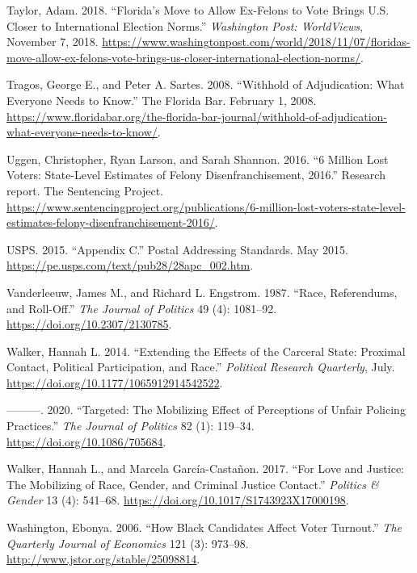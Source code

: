 \documentclass[
  12pt,
]{article}
\newlength{\cslhangindent}
\newenvironment{cslreferences}%
  {\setlength{\parindent}{0pt}%
  \everypar{\setlength{\hangindent}{\cslhangindent}}\ignorespaces}%
  {\par}
\begin{document}
\begin{cslreferences}
\leavevmode\hypertarget{ref-Taylor2018}{}%
Taylor, Adam. 2018. ``Florida's Move to Allow Ex-Felons to Vote Brings U.S. Closer to International Election Norms.'' \emph{Washington Post: WorldViews}, November 7, 2018. \url{https://www.washingtonpost.com/world/2018/11/07/floridas-move-allow-ex-felons-vote-brings-us-closer-international-election-norms/}.

\leavevmode\hypertarget{ref-Tragos2008}{}%
Tragos, George E., and Peter A. Sartes. 2008. ``Withhold of Adjudication: What Everyone Needs to Know.'' The Florida Bar. February 1, 2008. \url{https://www.floridabar.org/the-florida-bar-journal/withhold-of-adjudication-what-everyone-needs-to-know/}.

\leavevmode\hypertarget{ref-sentencing_2016}{}%
Uggen, Christopher, Ryan Larson, and Sarah Shannon. 2016. ``6 Million Lost Voters: State-Level Estimates of Felony Disenfranchisement, 2016.'' Research report. The Sentencing Project. \url{https://www.sentencingproject.org/publications/6-million-lost-voters-state-level-estimates-felony-disenfranchisement-2016/}.

\leavevmode\hypertarget{ref-USPS2015}{}%
USPS. 2015. ``Appendix C.'' Postal Addressing Standards. May 2015. \url{https://pe.usps.com/text/pub28/28apc_002.htm}.

\leavevmode\hypertarget{ref-Vanderleeuw1987}{}%
Vanderleeuw, James M., and Richard L. Engstrom. 1987. ``Race, Referendums, and Roll-Off.'' \emph{The Journal of Politics} 49 (4): 1081--92. \url{https://doi.org/10.2307/2130785}.

\leavevmode\hypertarget{ref-Walker2014}{}%
Walker, Hannah L. 2014. ``Extending the Effects of the Carceral State: Proximal Contact, Political Participation, and Race.'' \emph{Political Research Quarterly}, July. \url{https://doi.org/10.1177/1065912914542522}.

\leavevmode\hypertarget{ref-Walker2020}{}%
---------. 2020. ``Targeted: The Mobilizing Effect of Perceptions of Unfair Policing Practices.'' \emph{The Journal of Politics} 82 (1): 119--34. \url{https://doi.org/10.1086/705684}.

\leavevmode\hypertarget{ref-Walker2017}{}%
Walker, Hannah L., and Marcela García-Castañon. 2017. ``For Love and Justice: The Mobilizing of Race, Gender, and Criminal Justice Contact.'' \emph{Politics \& Gender} 13 (4): 541--68. \url{https://doi.org/10.1017/S1743923X17000198}.

\leavevmode\hypertarget{ref-Washington2006}{}%
Washington, Ebonya. 2006. ``How Black Candidates Affect Voter Turnout.'' \emph{The Quarterly Journal of Economics} 121 (3): 973--98. \url{http://www.jstor.org/stable/25098814}.


\end{cslreferences}
\end{document}
